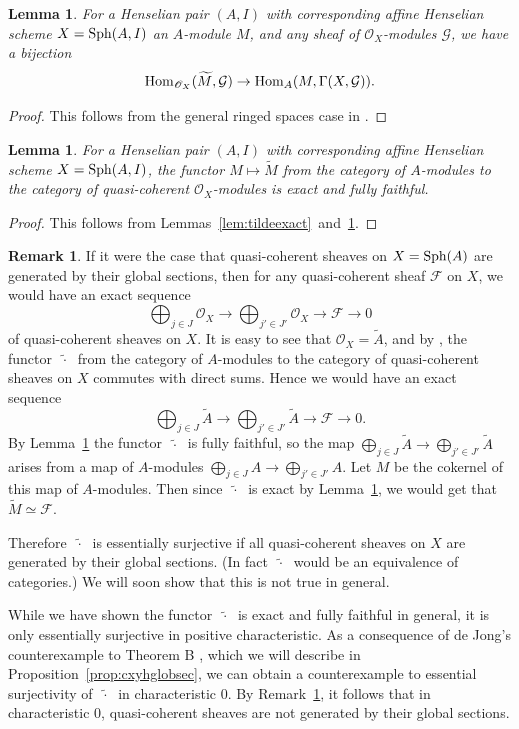 \documentclass[12pt]{article}
\renewcommand{\O}{\mathscr{O}}
\newcommand{\F}{\mathcal{F}}
\newcommand{\G}{\mathcal{G}}
\newcommand{\sph}{{\rm Sph}}
\newcommand{\Hom}{{\rm Hom}}
\newcommand{\spcite}[2]{\cite[\href{https://stacks.math.columbia.edu/tag/#1}{{#2} {#1}}]{stackp}}
\newtheorem{lemma}[theorem]{Lemma}
\theoremstyle{definition}
\newtheorem{remark}[theorem]{Remark}
\numberwithin{equation}{subsection}
\begin{document}
\begin{lemma}\label{lem:tildefunctor} For a Henselian pair $(A,I)$ with corresponding affine Henselian scheme $X=\sph(A,I)$ an $A$-module $M$, and any sheaf of $\O_X$-modules $\G$, we have a bijection $$\Hom_{\O_X}(\widetilde{M},\G) \to \Hom_A(M,\Gamma(X,\G)).$$
\end{lemma}
\begin{proof} This follows from the general ringed spaces case in \spcite{01BH}{Lemma}.\end{proof}

\begin{lemma}\label{lem:tildeffulexact} For a Henselian pair $(A,I)$ with corresponding affine Henselian scheme $X=\sph(A,I)$, the functor $M \mapsto \widetilde{M}$ from the category of $A$-modules to the category of quasi-coherent $\O_X$-modules is exact and fully faithful.
\end{lemma}
\begin{proof} This follows from Lemmas~\ref{lem:tildeexact}~and~\ref{lem:tildefunctor}.\end{proof}
\newcommand{\fwt}{\widetilde{\phantom{.}\cdot\phantom{.}}}



\begin{remark}\label{rmk:esssurjfwt}
 If it were the case that quasi-coherent sheaves on $X=\sph(A)$ are generated by their global sections, then for any quasi-coherent sheaf $\F$ on $X$, we would have an exact sequence $$\bigoplus_{j \in J} \O_X \to \bigoplus_{j' \in J'} \O_X \to \F \to 0$$ of quasi-coherent sheaves on $X$. It is easy to see that $\O_X=\widetilde{A}$, and by \spcite{01BH}{Lemma}, the functor $\fwt$ from the category of $A$-modules to the category of quasi-coherent sheaves on $X$ commutes with direct sums. Hence we would have an exact sequence $$\bigoplus_{j \in J} \widetilde{A} \to \bigoplus_{j' \in J'} \widetilde{A} \to \F \to 0.$$ By Lemma~\ref{lem:tildeffulexact} the functor $\fwt$ is fully faithful, so the map $\bigoplus_{j \in J} \widetilde{A} \to \bigoplus_{j' \in J'} \widetilde{A}$ arises from a map of $A$-modules $\bigoplus_{j \in J} A \to \bigoplus_{j' \in J'} A$. Let $M$ be the cokernel of this map of $A$-modules. Then since $\fwt$ is exact by Lemma~\ref{lem:tildeffulexact}, we would get that $\widetilde{M} \simeq \F$. 

Therefore $\fwt$ is essentially surjective if all quasi-coherent sheaves on $X$ are generated by their global sections. (In fact $\fwt$ would be an equivalence of categories.) We will soon show that this is not true in general.
\end{remark}
While we have shown the functor $\fwt$ is exact and fully faithful in general, it is only essentially surjective in positive characteristic. As a consequence of de Jong's counterexample to Theorem B \cite{nothmbblog}, which we will describe in Proposition~\ref{prop:cxyhglobsec}, we can obtain a counterexample to essential surjectivity of $\fwt$ in characteristic $0$. By Remark~\ref{rmk:esssurjfwt}, it follows that in characteristic $0$, quasi-coherent sheaves are not generated by their global sections. 
\end{document}
